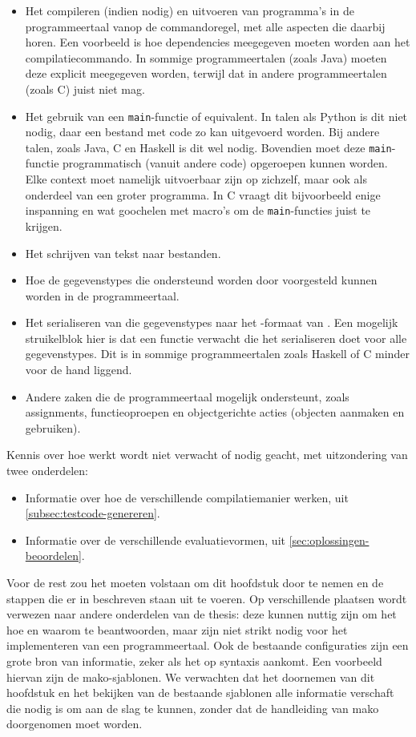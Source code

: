 \begin{itemize}
    \item Het compileren (indien nodig) en uitvoeren van programma's in de programmeertaal vanop de commandoregel, met alle aspecten die daarbij horen.
    Een voorbeeld is hoe dependencies meegegeven moeten worden aan het compilatiecommando.
    In sommige programmeertalen (zoals Java) moeten deze explicit meegegeven worden, terwijl dat in andere programmeertalen (zoals C) juist niet mag.
    \item Het gebruik van een \texttt{main}-functie of equivalent.
    In talen als Python is dit niet nodig, daar een bestand met code zo kan uitgevoerd worden.
    Bij andere talen, zoals Java, C en Haskell is dit wel nodig.
    Bovendien moet deze \texttt{main}-functie programmatisch (vanuit andere code) opgeroepen kunnen worden.
    Elke context moet namelijk uitvoerbaar zijn op zichzelf, maar ook als onderdeel van een groter programma.
    In C vraagt dit bijvoorbeeld enige inspanning en wat goochelen met macro's om de \texttt{main}-functies juist te krijgen.
    \item Het schrijven van tekst naar bestanden.
    \item Hoe de gegevenstypes die ondersteund worden door \tested{} voorgesteld kunnen worden in de programmeertaal.
    \item Het serialiseren van die gegevenstypes naar het -formaat van \tested{}.
    Een mogelijk struikelblok hier is dat \tested{} een functie verwacht die het serialiseren doet voor alle gegevenstypes.
    Dit is in sommige programmeertalen zoals Haskell of C minder voor de hand liggend.
    \item Andere zaken die de programmeertaal mogelijk ondersteunt, zoals assignments, functieoproepen en objectgerichte acties (objecten aanmaken en gebruiken).
\end{itemize}

Kennis over hoe \tested{} werkt wordt niet verwacht of nodig geacht, met uitzondering van twee onderdelen:

\begin{itemize}
    \item Informatie over hoe de verschillende compilatiemanier werken, uit \cref{subsec:testcode-genereren}.
    \item Informatie over de verschillende evaluatievormen, uit \cref{sec:oplossingen-beoordelen}.
\end{itemize}

Voor de rest zou het moeten volstaan om dit hoofdstuk door te nemen en de stappen die er in beschreven staan uit te voeren.
Op verschillende plaatsen wordt verwezen naar andere onderdelen van de thesis: deze kunnen nuttig zijn om het hoe en waarom te beantwoorden, maar zijn niet strikt nodig voor het implementeren van een programmeertaal.
Ook de bestaande configuraties zijn een grote bron van informatie, zeker als het op syntaxis aankomt.
Een voorbeeld hiervan zijn de mako-sjablonen.
We verwachten dat het doornemen van dit hoofdstuk en het bekijken van de bestaande sjablonen alle informatie verschaft die nodig is om aan de slag te kunnen, zonder dat de handleiding van mako doorgenomen moet worden.

